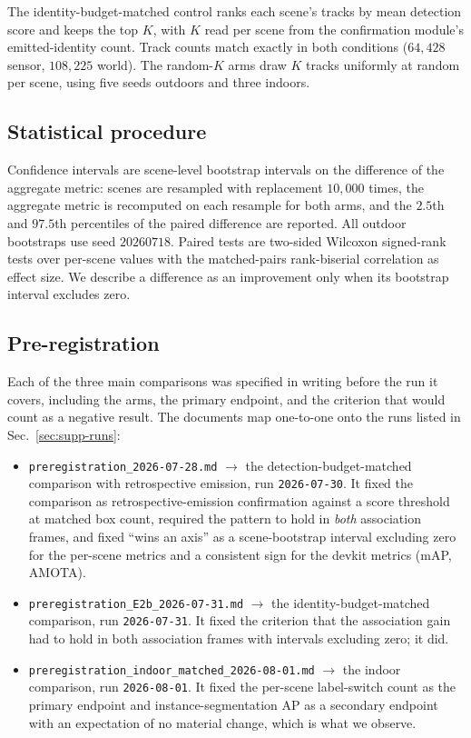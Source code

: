 The identity-budget-matched control ranks each scene's tracks by mean
detection score and keeps the top $K$, with $K$ read per scene from the
confirmation module's emitted-identity count. Track counts match exactly in
both conditions ($64{,}428$ sensor, $108{,}225$ world). The random-$K$ arms
draw $K$ tracks uniformly at random per scene, using five seeds outdoors and
three indoors.

\subsection{Statistical procedure}
\label{sec:supp-stats}

Confidence intervals are scene-level bootstrap intervals on the difference of
the aggregate metric: scenes are resampled with replacement $10{,}000$ times,
the aggregate metric is recomputed on each resample for both arms, and the
$2.5$th and $97.5$th percentiles of the paired difference are reported. All
outdoor bootstraps use seed $20260718$. Paired tests are two-sided Wilcoxon
signed-rank tests over per-scene values with the matched-pairs rank-biserial
correlation as effect size. We describe a difference as an improvement only
when its bootstrap interval excludes zero.

\subsection{Pre-registration}
\label{sec:supp-prereg}

Each of the three main comparisons was specified in writing before the run it
covers, including the arms, the primary endpoint, and the criterion that would
count as a negative result. The documents map one-to-one onto the runs listed
in Sec.~\ref{sec:supp-runs}:

\begin{itemize}\itemsep1pt
\item \texttt{preregistration\_2026-07-28.md} $\rightarrow$ the
detection-budget-matched comparison with retrospective emission, run
\texttt{2026-07-30}. It fixed the comparison as retrospective-emission
confirmation against a score threshold at matched box count, required the
pattern to hold in \emph{both} association frames, and fixed ``wins an axis''
as a scene-bootstrap interval excluding zero for the per-scene metrics and a
consistent sign for the devkit metrics (mAP, AMOTA).
\item \texttt{preregistration\_E2b\_2026-07-31.md} $\rightarrow$ the
identity-budget-matched comparison, run \texttt{2026-07-31}. It fixed the
criterion that the association gain had to hold in both association frames
with intervals excluding zero; it did.
\item \texttt{preregistration\_indoor\_matched\_2026-08-01.md} $\rightarrow$
the indoor comparison, run \texttt{2026-08-01}. It fixed the per-scene
label-switch count as the primary endpoint and instance-segmentation AP as a
secondary endpoint with an expectation of no material change, which is what
we observe.
\end{itemize}


